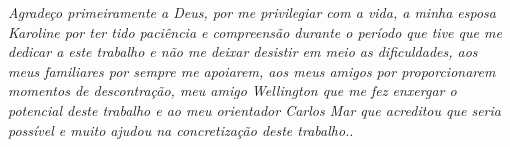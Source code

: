 \begin{agradecimentos}

\textit{Agradeço primeiramente a Deus, por me privilegiar com a vida, a minha esposa Karoline por ter tido paciência e compreensão durante o período que tive que me dedicar a este trabalho e não me deixar desistir em meio as dificuldades, aos meus familiares por sempre me apoiarem, aos meus amigos por proporcionarem momentos de descontração, meu amigo Wellington que me fez enxergar o potencial deste trabalho e ao meu orientador Carlos Mar que acreditou que seria possível e muito ajudou na concretização deste trabalho.}.

\end{agradecimentos}
